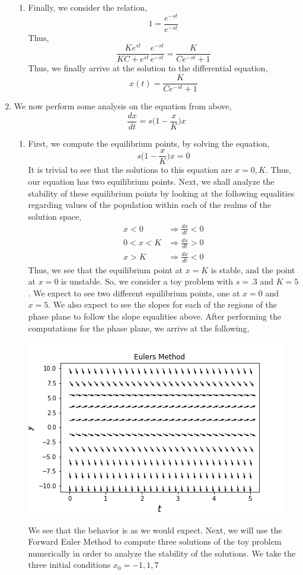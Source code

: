 \documentclass[letterpaper,10pt]{article}
\begin{document}
\begin{enumerate}
\begin{enumerate}
\item Finally, we consider the relation,
\[1=\frac{e^{-st}}{e^{-st}}\]
Thus,
\[\frac{Ke^{st}}{KC+e^{st}}\frac{e^{-st}}{e^{-st}}=\frac{K}{Ce^{-st}+1}\]
Thus, we finally arrive at the solution to the differential equation,
\[x(t)=\frac{K}{Ce^{-st}+1}\]
\end{enumerate}
\item We now perform some analysis on the equation from above,
\[\frac{dx}{dt}=s\bigg(1-\frac{x}{K}\bigg)x\]
\begin{enumerate}
\item First, we compute the equilibrium points, by solving the equation,
\[s\bigg(1-\frac{x}{K}\bigg)x=0\]
It is trivial to see that the solutions to this equation are $x=0,K$. Thus, our equation has two equilibrium points. Next, we shall analyze the stability of these equilibrium points by looking at the following equalities regarding values of the population within each of the realms of the solution space,
\begin{align*}
x<0 &\Rightarrow \frac{dx}{dt}<0\\
0<x<K &\Rightarrow \frac{dx}{dt}>0\\
x>K &\Rightarrow \frac{dx}{dt}<0
\end{align*}
Thus, we see that the equilibrium point at $x=K$ is stable, and the point at $x=0$ is unstable. So, we consider a toy problem with $s=.3$ and $K=5$. We expect to see two different equilibrium points, one at $x=0$ and $x=5$. We also expect to see the slopes for each of the regions of the phase plane to follow the slope equalities above. After performing the computations for the phase plane, we arrive at the following,
\begin{center}
\includegraphics[scale=1]{2a.png}
\end{center}
We see that the behavior is as we would expect. Next, we will use the Forward Euler Method to compute three solutions of the toy problem numerically in order to analyze the stability of the solutions. We take the three initial conditions $x_0=-1,1,7$

\end{enumerate}
\end{enumerate}
\end{document}
